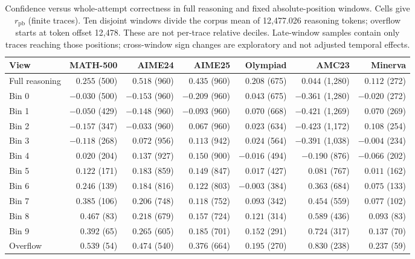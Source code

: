 \begin{table}[t]
\centering
\footnotesize
\caption{Confidence versus whole-attempt correctness in full reasoning and fixed absolute-position windows. Cells give $r_{\mathrm{pb}}$ (finite traces). Ten disjoint windows divide the corpus mean of 12,477.026 reasoning tokens; overflow starts at token offset 12,478. These are not per-trace relative deciles. Late-window samples contain only traces reaching those positions; cross-window sign changes are exploratory and not adjusted temporal effects. }
\label{tab:qwen-corr-views}
\begin{tabular}{@{}lrrrrrr@{}}
\toprule
View & MATH-500 & AIME24 & AIME25 & Olympiad & AMC23 & Minerva \\
\midrule
Full reasoning & $0.255$ (500) & $0.518$ (960) & $0.435$ (960) & $0.208$ (675) & $0.044$ (1,280) & $0.112$ (272) \\
Bin 0 & $-0.030$ (500) & $-0.153$ (960) & $-0.209$ (960) & $0.043$ (675) & $-0.361$ (1,280) & $-0.020$ (272) \\
Bin 1 & $-0.050$ (429) & $-0.148$ (960) & $-0.093$ (960) & $0.070$ (668) & $-0.421$ (1,269) & $0.070$ (269) \\
Bin 2 & $-0.157$ (347) & $-0.033$ (960) & $0.067$ (960) & $0.023$ (634) & $-0.423$ (1,172) & $0.108$ (254) \\
Bin 3 & $-0.118$ (268) & $0.072$ (956) & $0.113$ (942) & $0.024$ (564) & $-0.391$ (1,038) & $-0.004$ (234) \\
Bin 4 & $0.020$ (204) & $0.137$ (927) & $0.150$ (900) & $-0.016$ (494) & $-0.190$ (876) & $-0.066$ (202) \\
Bin 5 & $0.122$ (171) & $0.183$ (859) & $0.149$ (847) & $0.017$ (427) & $0.081$ (767) & $0.011$ (162) \\
Bin 6 & $0.246$ (139) & $0.184$ (816) & $0.122$ (803) & $-0.003$ (384) & $0.363$ (684) & $0.075$ (133) \\
Bin 7 & $0.385$ (106) & $0.206$ (748) & $0.118$ (752) & $0.093$ (342) & $0.454$ (559) & $0.077$ (102) \\
Bin 8 & $0.467$ (83) & $0.218$ (679) & $0.157$ (724) & $0.121$ (314) & $0.589$ (436) & $0.093$ (83) \\
Bin 9 & $0.392$ (65) & $0.265$ (605) & $0.185$ (701) & $0.152$ (291) & $0.724$ (317) & $0.137$ (70) \\
Overflow & $0.539$ (54) & $0.474$ (540) & $0.376$ (664) & $0.195$ (270) & $0.830$ (238) & $0.237$ (59) \\
\bottomrule
\end{tabular}
\end{table}

